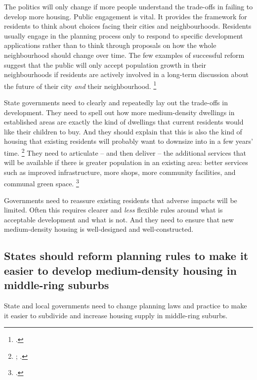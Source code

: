 The politics will only change if more people understand the trade-offs in failing to develop more housing.
Public engagement is vital.
It provides the framework for residents to think about choices facing their cities and neighbourhoods.
Residents usually engage in the planning process only to respond to specific development applications rather than to think through proposals on how the whole neighbourhood should change over time.
The few examples of successful reform suggest that the public will only accept population growth in their neighbourhoods if residents are actively involved in a long-term discussion about the future of their city \emph{and} their neighbourhood.%
	\footcites{KellyHarrisonHunterEtAl2013}{Kelly-2010-Cities-who-decides}

State governments need to clearly and repeatedly lay out the trade-offs in development.
They need to spell out how more medium-density dwellings in established areas are exactly the kind of dwellings that current residents would like their children to buy.
And they should explain that this is also the kind of housing that existing residents will probably want to downsize into in a few years' time.%
	\footnote{\textcite{Daley-2017-AAA-Housing-for-older-Australians-COTA-prez}; .}
They need to articulate -- and then deliver -- the additional services that will be available if there is greater population in an existing area: better services such as improved infrastructure, more shops, more community facilities, and communal green space.%
	\footcite{Sweet-2010-Why-medium-density-is-health-issue}

Governments need to reassure existing residents that adverse impacts will be limited.
Often this requires clearer and \emph{less} flexible rules around what is acceptable development and what is not.
And they need to ensure that new medium-density housing is well-designed and well-constructed.

\subsection{States should reform planning rules to make it easier to develop medium-density housing in middle-ring suburbs}\label{subsec:states-should-reform-planning-rules-to-make-subdivisions-in-middle-ring-suburbs-easier-and-engage-communities-in-suburban-development}

State and local governments need to change planning laws and practice to make it easier to subdivide and increase housing supply in middle-ring suburbs.


